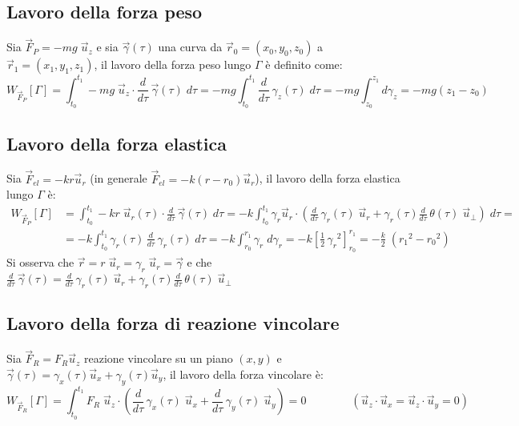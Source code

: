 \documentclass[a4paper]{article}
\newcommand\ux{\vec{u}_x}
\newcommand\uy{\vec{u}_y}
\newcommand\uz{\vec{u}_z}
\newcommand\ur{\vec{u}_r}
\newcommand\uper{\vec{u}_\perp}
\newcommand\dtau{\frac{d}{d\tau}\,}
\begin{document}
\subsection{Lavoro della forza peso}
Sia \(\vec{F}_P = -mg \; \uz\) e sia \(\vec{\gamma}(\tau)\) una curva da \(\vec{r}_0 = (x_0, y_0, z_0)\) a \(\vec{r}_1 = (x_1, y_1, z_1)\),
il lavoro della forza peso lungo \(\Gamma\) è definito come:
\[W_{\vec{F}_P}[\Gamma] = \int_{t_0}^{t_1} -mg \; \uz \cdot \dtau \vec{\gamma}(\tau) \; d\tau = - mg \int_{t_0}^{t_1} \dtau \gamma_z(\tau) \; d\tau = -mg \int_{z_0}^{z_1} d\gamma_z = -mg (z_1 - z_0)\]

\subsection{Lavoro della forza elastica}
Sia \(\vec{F}_{el} = - kr \ur\) (in generale \(\vec{F}_{el} = - k (r - r_0) \ur\)), il lavoro della forza elastica lungo \(\Gamma\) è:
\begin{align*}
	W_{\vec{F}_P}[\Gamma] &= \int_{t_0}^{t_1} -kr \; \ur(\tau) \cdot \dtau \vec{\gamma}(\tau) \; d\tau = - k \int_{t_0}^{t_1} \gamma_r \ur \cdot \left( \dtau \gamma_r(\tau) \; \ur + \gamma_r(\tau) \dtau \theta(\tau) \; \uper \right) \; d\tau = \\
	&= -k \int_{t_0}^{t_1} \gamma_r(\tau) \, \dtau \gamma_r(\tau) \; d\tau = -k \int_{r_0}^{r_1} \gamma_r \; d\gamma_r = -k \left[ \frac{1}{2} \, {\gamma_r}^2 \right]_{r_0}^{r_1} = -\frac{k}{2} \; \left( {r_1}^2 - {r_0}^2 \right)
\end{align*}
Si osserva che \(\vec{r} = r \; \ur = \gamma_r \; \ur = \vec{\gamma}\) e che \(\displaystyle \dtau \vec{\gamma}(\tau) = \dtau \gamma_r(\tau) \; \ur + \gamma_r(\tau) \dtau \theta(\tau) \; \uper\)

\newpage

\subsection{Lavoro della forza di reazione vincolare}
Sia \(\vec{F}_R = F_R \uz\) reazione vincolare su un piano \((x,y)\) e \(\vec{\gamma}(\tau) = \gamma_x(\tau) \ux + \gamma_y(\tau) \uy\),
il lavoro della forza vincolare è:
\[W_{\vec{F}_R}[\Gamma] = \int_{t_0}^{t_1} F_R \; \uz \cdot \left( \dtau \gamma_x(\tau) \; \ux + \dtau \gamma_y(\tau) \; \uy \right) = 0 \qquad \qquad (\uz \cdot \ux = \uz \cdot \uy = 0)\]
\end{document}
